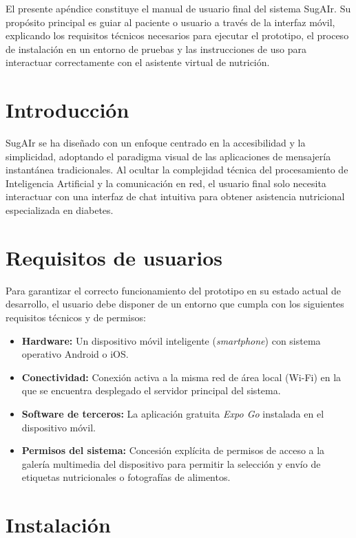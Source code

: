 
El presente apéndice constituye el manual de usuario final del sistema SugAIr. Su propósito principal es guiar al paciente o usuario a través de la interfaz móvil, explicando los requisitos técnicos necesarios para ejecutar el prototipo, el proceso de instalación en un entorno de pruebas y las instrucciones de uso para interactuar correctamente con el asistente virtual de nutrición.

\section{Introducción}
SugAIr se ha diseñado con un enfoque centrado en la accesibilidad y la simplicidad, adoptando el paradigma visual de las aplicaciones de mensajería instantánea tradicionales. Al ocultar la complejidad técnica del procesamiento de Inteligencia Artificial y la comunicación en red, el usuario final solo necesita interactuar con una interfaz de chat intuitiva para obtener asistencia nutricional especializada en diabetes.

\section{Requisitos de usuarios}
Para garantizar el correcto funcionamiento del prototipo en su estado actual de desarrollo, el usuario debe disponer de un entorno que cumpla con los siguientes requisitos técnicos y de permisos:

\begin{itemize}
    \item \textbf{Hardware:} Un dispositivo móvil inteligente (\textit{smartphone}) con sistema operativo Android o iOS.
    \item \textbf{Conectividad:} Conexión activa a la misma red de área local (Wi-Fi) en la que se encuentra desplegado el servidor principal del sistema.
    \item \textbf{Software de terceros:} La aplicación gratuita \textit{Expo Go} instalada en el dispositivo móvil.
    \item \textbf{Permisos del sistema:} Concesión explícita de permisos de acceso a la galería multimedia del dispositivo para permitir la selección y envío de etiquetas nutricionales o fotografías de alimentos.
\end{itemize}

\clearpage
\section{Instalación}


